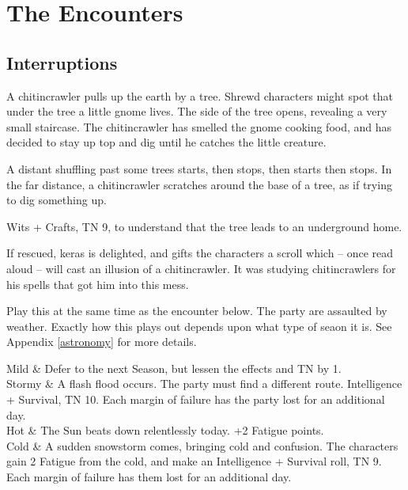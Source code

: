 \section{The Encounters}

\begin{multicols}{2}

\subsection{Interruptions}\label{interruptions}


A chitincrawler pulls up the earth by a tree.  Shrewd characters might spot that under the tree a little gnome lives.  The side of the tree opens, revealing a very small staircase.  The chitincrawler has smelled the gnome cooking food, and has decided to stay up top and dig until he catches the little creature.

\begin{boxtext}

	A distant shuffling past some trees starts, then stops, then starts then stops.
	In the far distance, a chitincrawler scratches around the base of a tree, as if trying to dig something up.

\end{boxtext}

Wits + Crafts, TN 9, to understand that the tree leads to an underground home.

\chitincrawler


\gnomishillusionist

If rescued, \gls{keras} is delighted, and gifts the characters a scroll which -- once read aloud -- will cast an illusion of a chitincrawler.  It was studying chitincrawlers for his spells that got him into this mess.

Play this at the same time as the encounter below.  The party are assaulted by weather.  Exactly how this plays out depends upon what type of seaon it is.  See Appendix \ref{astronomy} for more details.

\vfill\null

\begin{rollchart}

	Mild & Defer to the next Season, but lessen the effects and TN by 1. \\
	Stormy & A flash flood occurs.  The party must find a different route.  Intelligence + Survival, TN 10.  Each margin of failure has the party lost for an additional day. \\
	Hot & The Sun beats down relentlessly today.  +2 Fatigue points. \\
	Cold & A sudden snowstorm comes, bringing cold and confusion.  The characters gain 2 Fatigue from the cold, and make an Intelligence + Survival roll, TN 9.  Each margin of failure has them lost for an additional day.


\end{rollchart}
\end{multicols}

